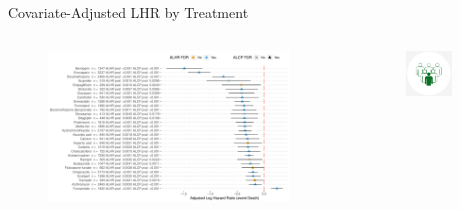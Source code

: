 \documentclass[compress,ignorenonframetext,aspectratio=1610]{beamer}
\begin{document}
\begin{frame}{Covariate-Adjusted LHR by Treatment}
	\begin{columns}
		\begin{figure}
			\includegraphics[width=0.94\textwidth]{figs/results/bps_covid_repurposing_summary.pdf}
		\end{figure}

		\begin{figure}
			\includegraphics[width=0.7\textwidth]{figs/logos/bps.png}	
		\end{figure}


\end{columns}
\end{frame}
\end{document}
